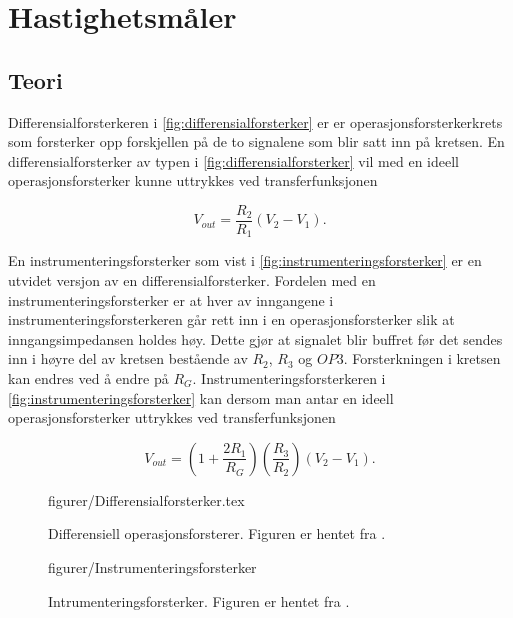 \section{Hastighetsmåler}
\subsection{Teori}
Differensialforsterkeren i \autoref{fig:differensialforsterker} er er operasjonsforsterkerkrets som forsterker opp forskjellen på de to signalene som blir satt inn på kretsen.
En differensialforsterker av typen i \autoref{fig:differensialforsterker} vil med en ideell operasjonsforsterker kunne uttrykkes ved transferfunksjonen \cite{Johnson}

\begin{equation}
    V_{out} = \frac{R_2}{R_1}(V_2-V_1).
    \label{eq:differensialforsterker}
\end{equation}

En instrumenteringsforsterker som vist i \autoref{fig:instrumenteringsforsterker} er en utvidet versjon av en differensialforsterker.
Fordelen med en instrumenteringsforsterker er at hver av inngangene i instrumenteringsforsterkeren går rett inn i en operasjonsforsterker slik at inngangsimpedansen holdes høy.
Dette gjør at signalet blir buffret før det sendes inn i høyre del av kretsen bestående av $R_2$, $R_3$ og $OP3$.
Forsterkningen i kretsen kan endres ved å endre på $R_G$.
Instrumenteringsforsterkeren i \autoref{fig:instrumenteringsforsterker} kan dersom man antar en ideell operasjonsforsterker uttrykkes ved transferfunksjonen \cite{Johnson}

\begin{equation}
    V_{out} = (1+\frac{2R_1}{R_G})(\frac{R_3}{R_2})(V_2-V_1).
    \label{eq:instrumenteringsforsterker}
\end{equation}


\begin{figure} [h]
    \centering
     {figurer/Differensialforsterker.tex}
    \caption{Differensiell operasjonsforsterer. Figuren er hentet fra \cite{Johnson}.}
    \label{fig:differensialforsterker}
\end{figure}


\begin{figure} [h]
    \centering
     {figurer/Instrumenteringsforsterker}
    \caption{Intrumenteringsforsterker. Figuren er hentet fra \cite{Johnson}.}
    \label{fig:instrumenteringsforsterker}
\end{figure}








